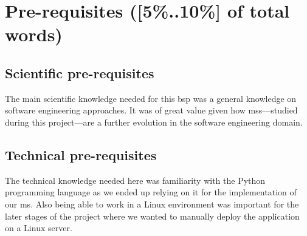 \section{Pre-requisites ([5\%..10\%] of total words)} 


\subsection{Scientific pre-requisites}

The main scientific knowledge needed for this \gls{bsp} was a general
knowledge on software engineering approaches. It was of great value
given how \glspl{ms}---studied during this project---are a further
evolution in the software engineering domain.

\subsection{Technical pre-requisites}

The technical knowledge needed here was familiarity with the Python
programming language as we ended up relying on it for the
implementation of our \gls{ms}. Also being able to work in a Linux
environment was important for the later stages of the project where we
wanted to manually deploy the application on a Linux server.
